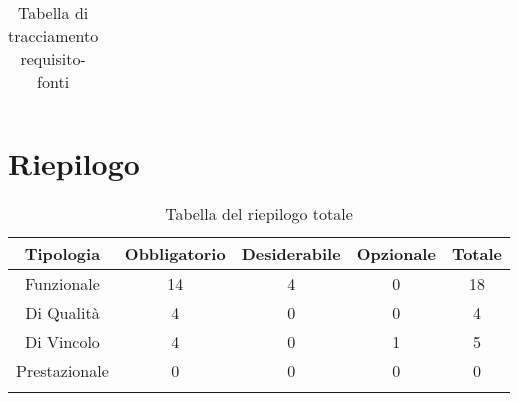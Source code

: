 \begin{center}
\begin{longtable}{|C{6cm}|C{6cm}|}
    \caption{Tabella di tracciamento requisito-fonti}
  \end{longtable}
\end{center}


\section{Riepilogo}

\begin{center}
  \centering
  \begin{longtable}{|c|c|c|c|c|}
    \hline
    \rowcolor[HTML]{036400}
    {\color[HTML]{FFFFFF} \textbf{Tipologia}} & {\color[HTML]{FFFFFF} \textbf{Obbligatorio}} & {\color[HTML]{FFFFFF} \textbf{Desiderabile}} & {\color[HTML]{FFFFFF} \textbf{Opzionale}}  & {\color[HTML]{FFFFFF} \textbf{Totale}} \\ \hline
    \rowcolor[HTML]{EFEFEF}
    Funzionale & 14 & 4 & 0 & 18 \\ \hline
    \rowcolor[HTML]{C0C0C0}
    Di Qualità & 4 & 0 & 0 & 4 \\ \hline
    \rowcolor[HTML]{EFEFEF}
    Di Vincolo & 4 & 0 & 1 & 5 \\ \hline
    \rowcolor[HTML]{C0C0C0}
    Prestazionale & 0 & 0 & 0 & 0 \\ \hline

    \caption{Tabella del riepilogo totale}
  \end{longtable}
\end{center}
